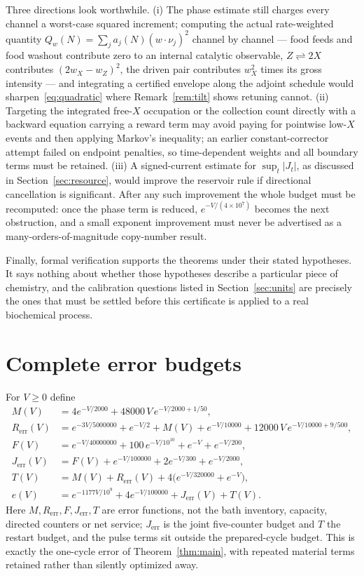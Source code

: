 \documentclass[11pt,a4paper]{article}
\theoremstyle{plain}
\theoremstyle{definition}
\theoremstyle{remark}
\begin{document}
Three directions look worthwhile. (i) The phase estimate still charges every channel a worst-case squared increment; computing the actual rate-weighted quantity $Q_w(N)=\sum_ja_j(N)(w\cdot\nu_j)^2$ channel by channel --- food feeds and food washout contribute zero to an internal catalytic observable, $Z\rightleftharpoons2X$ contributes $(2w_X-w_Z)^2$, the driven pair contributes $w_X^2$ times its gross intensity --- and integrating a certified envelope along the adjoint schedule would sharpen~\eqref{eq:quadratic} where Remark~\ref{rem:tilt} shows retuning cannot. (ii) Targeting the integrated free-$X$ occupation or the collection count directly with a backward equation carrying a reward term may avoid paying for pointwise low-$X$ events and then applying Markov's inequality; an earlier constant-corrector attempt failed on endpoint penalties, so time-dependent weights and all boundary terms must be retained. (iii) A signed-current estimate for $\sup_t|J_t|$, as discussed in Section~\ref{sec:resource}, would improve the reservoir rule if directional cancellation is significant. After any such improvement the whole budget must be recomputed: once the phase term is reduced, $e^{-V/(4\times10^{7})}$ becomes the next obstruction, and a small exponent improvement must never be advertised as a many-orders-of-magnitude copy-number result.

Finally, formal verification supports the theorems under their stated hypotheses. It says nothing about whether those hypotheses describe a particular piece of chemistry, and the calibration questions listed in Section~\ref{sec:units} are precisely the ones that must be settled before this certificate is applied to a real biochemical process.

\appendix

\section{Complete error budgets}\label{app:error}

For $V\ge0$ define
\begin{align*}
M(V)&=4e^{-V/2000}+48000\,V\,e^{-V/2000+1/50},\\
R_{\mathrm{err}}(V)&=e^{-3V/5000000}+e^{-V/2}+M(V)+e^{-V/10000}+12000\,V\,e^{-V/10000+9/500},\\
F(V)&=e^{-V/40000000}+100\,e^{-V/10^{10}}+e^{-V}+e^{-V/200},\\
J_{\mathrm{err}}(V)&=F(V)+e^{-V/100000}+2e^{-V/300}+e^{-V/2000},\\
T(V)&=M(V)+R_{\mathrm{err}}(V)+4\bigl(e^{-V/320000}+e^{-V}\bigr),\\
e(V)&=e^{-1177V/10^{9}}+4e^{-V/100000}+J_{\mathrm{err}}(V)+T(V).
\end{align*}
Here $M,R_{\mathrm{err}},F,J_{\mathrm{err}},T$ are error functions, not the bath inventory, capacity, directed counters or net service; $J_{\mathrm{err}}$ is the joint five-counter budget and $T$ the restart budget, and the pulse terms sit outside the prepared-cycle budget. This is exactly the one-cycle error of Theorem~\ref{thm:main}, with repeated material terms retained rather than silently optimized away.
\end{document}
